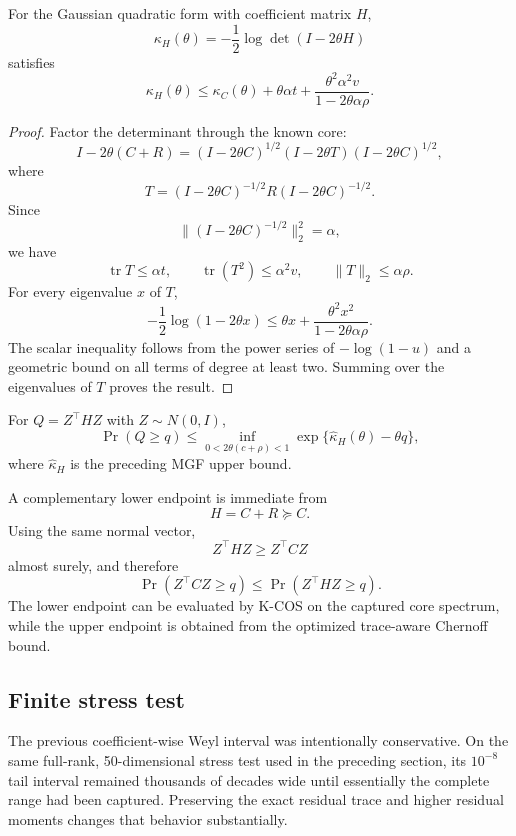 \begin{theorem}\label{claim:final-23-2}
For the Gaussian quadratic form with coefficient matrix \(H\),
\[
\kappa_H(\theta)
=-\frac12\log\det(I-2\theta H)
\]
satisfies
\[
\boxed{
\kappa_H(\theta)
\le
\kappa_C(\theta)
+
\theta\alpha t
+
\frac{\theta^2\alpha^2v}
     {1-2\theta\alpha\rho}.
}
\]
\end{theorem}

\begin{proof}
Factor the determinant through the known core:
\[
I-2\theta(C+R)
=
(I-2\theta C)^{1/2}
(I-2\theta T)
(I-2\theta C)^{1/2},
\]
where
\[
T=(I-2\theta C)^{-1/2}
R
(I-2\theta C)^{-1/2}.
\]
Since
\[
\|(I-2\theta C)^{-1/2}\|_2^2=\alpha,
\]
we have
\[
\operatorname{tr}T\le\alpha t,
\qquad
\operatorname{tr}(T^2)\le\alpha^2v,
\qquad
\|T\|_2\le\alpha\rho.
\]
For every eigenvalue \(x\) of \(T\),
\[
-\frac12\log(1-2\theta x)
\le
\theta x
+
\frac{\theta^2x^2}
     {1-2\theta\alpha\rho}.
\]
The scalar inequality follows from the power series of \(-\log(1-u)\) and a
geometric bound on all terms of degree at least two.  Summing over the
eigenvalues of \(T\) proves the result.
\end{proof}

\begin{corollary}\label{claim:final-23-3}
For \(Q=Z^\top HZ\) with \(Z\sim N(0,I)\),
\[
\boxed{
\Pr(Q\ge q)
\le
\inf_{0<2\theta(c+\rho)<1}
\exp\{\widehat\kappa_H(\theta)-\theta q\},
}
\]
where \(\widehat\kappa_H\) is the preceding MGF upper bound.
\end{corollary}

A complementary lower endpoint is immediate from
\[
H=C+R\succeq C.
\]
Using the same normal vector,
\[
Z^\top HZ\ge Z^\top CZ
\]
almost surely, and therefore
\[
\boxed{
\Pr(Z^\top CZ\ge q)
\le
\Pr(Z^\top HZ\ge q).
}
\]
The lower endpoint can be evaluated by K-COS on the captured core spectrum,
while the upper endpoint is obtained from the optimized trace-aware Chernoff
bound.

\subsection{Finite stress test}

The previous coefficient-wise Weyl interval was intentionally conservative.
On the same full-rank, 50-dimensional stress test used in the preceding
section, its \(10^{-8}\) tail interval remained thousands of decades wide
until essentially the complete range had been captured.  Preserving the exact
residual trace and higher residual moments changes that behavior substantially.

